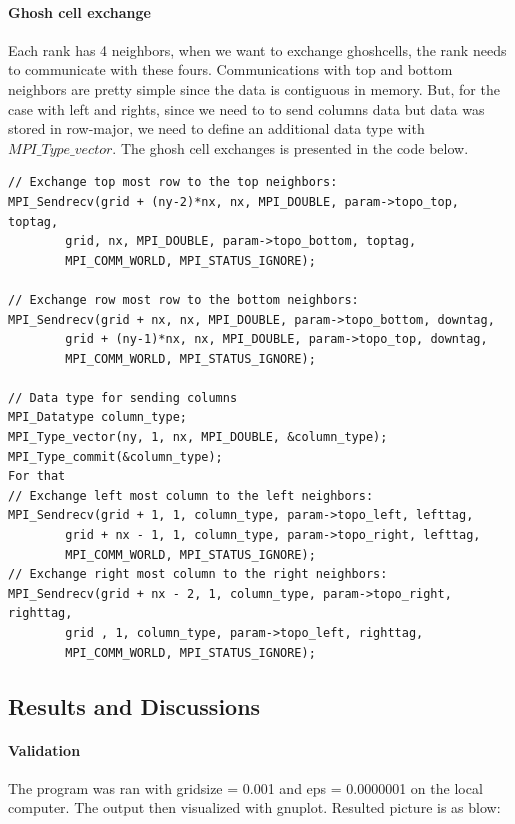\documentclass[article]{scrartcl}
\begin{document}
\paragraph{Ghosh cell exchange}
Each rank has 4 neighbors, when we want to exchange ghoshcells, the rank needs to communicate with these fours. Communications with top and bottom neighbors are pretty simple since the data is contiguous in memory. But, for the case with left and rights, since we need to to send columns data but data was stored in row-major, we need to define an additional data type with $MPI\_Type\_vector$. The ghosh cell exchanges is presented in the code below.
\begin{frame}[]
\begin{lstlisting}[frame=single]
// Exchange top most row to the top neighbors:
MPI_Sendrecv(grid + (ny-2)*nx, nx, MPI_DOUBLE, param->topo_top, toptag,
        grid, nx, MPI_DOUBLE, param->topo_bottom, toptag,
        MPI_COMM_WORLD, MPI_STATUS_IGNORE);

// Exchange row most row to the bottom neighbors:
MPI_Sendrecv(grid + nx, nx, MPI_DOUBLE, param->topo_bottom, downtag,
        grid + (ny-1)*nx, nx, MPI_DOUBLE, param->topo_top, downtag,
        MPI_COMM_WORLD, MPI_STATUS_IGNORE);

// Data type for sending columns
MPI_Datatype column_type;
MPI_Type_vector(ny, 1, nx, MPI_DOUBLE, &column_type);
MPI_Type_commit(&column_type);
For that
// Exchange left most column to the left neighbors:
MPI_Sendrecv(grid + 1, 1, column_type, param->topo_left, lefttag, 
        grid + nx - 1, 1, column_type, param->topo_right, lefttag, 
        MPI_COMM_WORLD, MPI_STATUS_IGNORE);
// Exchange right most column to the right neighbors:
MPI_Sendrecv(grid + nx - 2, 1, column_type, param->topo_right, righttag,
        grid , 1, column_type, param->topo_left, righttag, 
        MPI_COMM_WORLD, MPI_STATUS_IGNORE);
\end{lstlisting}
\end{frame}
\subsection{Results and Discussions}
\paragraph{Validation}
The program was ran with gridsize = 0.001 and eps = 0.0000001 on the local computer. The output then visualized with gnuplot. Resulted picture is as blow:
\end{document}
